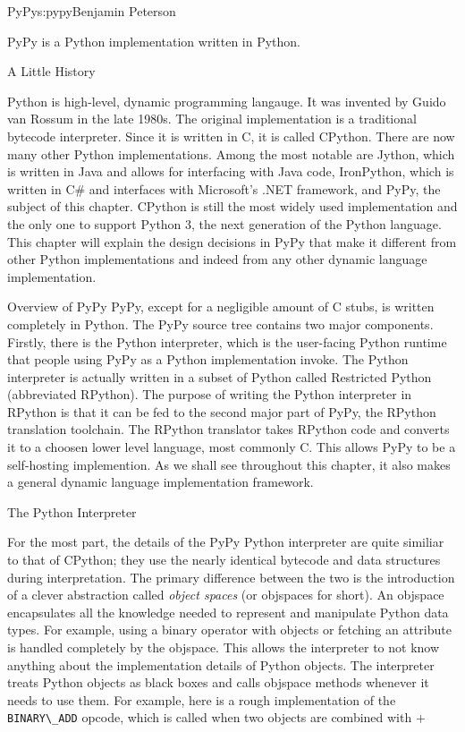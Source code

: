 \begin{aosachapter}{PyPy}{s:pypy}{Benjamin Peterson}

PyPy is a Python implementation written in Python.

\begin{aosasect1}{A Little History}

Python is high-level, dynamic programming langauge. It was invented by Guido van
Rossum in the late 1980s. The original implementation is a traditional bytecode
interpreter. Since it is written in C, it is called CPython. There are now many
other Python implementations. Among the most notable are Jython, which is
written in Java and allows for interfacing with Java code, IronPython, which is
written in C\# and interfaces with Microsoft's .NET framework, and PyPy, the
subject of this chapter. CPython is still the most widely used implementation
and the only one to support Python 3, the next generation of the Python
language. This chapter will explain the design decisions in PyPy that make it
different from other Python implementations and indeed from any other dynamic
language implementation.

\end{aosasect1}

\begin{aosasect1}{Overview of PyPy}
PyPy, except for a negligible amount of C stubs, is written completely in
Python. The PyPy source tree contains two major components. Firstly, there is
the Python interpreter, which is the user-facing Python runtime that people
using PyPy as a Python implementation invoke. The Python interpreter is actually
written in a subset of Python called Restricted Python (abbreviated
RPython). The purpose of writing the Python interpreter in RPython is that it
can be fed to the second major part of PyPy, the RPython translation
toolchain. The RPython translator takes RPython code and converts it to a
choosen lower level language, most commonly C. This allows PyPy to be a
self-hosting implemention. As we shall see throughout this chapter, it also
makes a general dynamic language implementation framework.

\end{aosasect1}

\begin{aosasect1}{The Python Interpreter}

For the most part, the details of the PyPy Python interpreter are quite similiar
to that of CPython; they use the nearly identical bytecode and data structures
during interpretation. The primary difference between the two is the
introduction of a clever abstraction called \emph{object spaces} (or objspaces
for short). An objspace encapsulates all the knowledge needed to represent and
manipulate Python data types. For example, using a binary operator with objects
or fetching an attribute is handled completely by the objspace. This allows the
interpreter to not know anything about the implementation details of Python
objects. The interpreter treats Python objects as black boxes and calls objspace
methods whenever it needs to use them. For example, here is a rough
implementation of the \verb+BINARY\_ADD+ opcode, which is called when two
objects are combined with +


\end{aosasect1}
\end{aosachapter}
